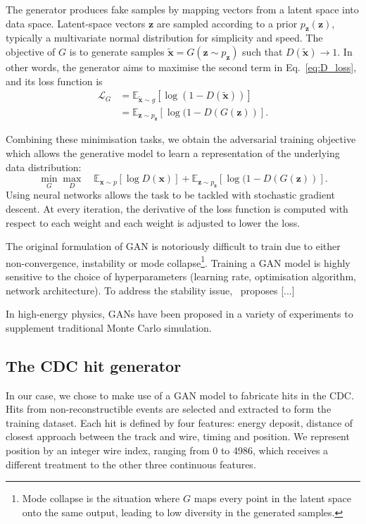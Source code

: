 The generator produces fake samples by mapping vectors from a latent space into data space. Latent-space vectors $\mathbf{z}$ are sampled according to a prior $p_\mathbf{z}(\mathbf{z})$, typically a multivariate normal distribution for simplicity and speed. The objective of $G$ is to generate samples $\tilde{\mathbf{x}} = G(\mathbf{z} \sim p_\mathbf{z})$ such that $D(\tilde{\mathbf{x}}) \rightarrow 1$. In other words, the generator aims to maximise the second term in Eq.~\ref{eq:D_loss}, and its loss function is
\begin{align*}
    \mathcal{L}_G &=     
    \mathbb{E}_{\tilde{\mathbf{x}} \sim g} [ \log( 1 - D(\tilde{\mathbf{x}}) )]\\
    &= \mathbb{E}_{\mathbf{z} \sim p_\mathbf{z}} [ \log( 1 - D(G(\mathbf{z}) )].
\end{align*}

Combining these minimisation tasks, we obtain the adversarial training objective which allows the generative model to learn a representation of the underlying data distribution:
\begin{equation*}
    \min_G \max_D \quad
    \mathbb{E}_{\mathbf{x} \sim p} [ \log D(\mathbf{x}) ] +
    \mathbb{E}_{\mathbf{z} \sim p_\mathbf{z}} [ \log( 1 - D(G(\mathbf{z}) )].
\end{equation*}
Using neural networks allows the task to be tackled with stochastic gradient descent. At every iteration, the derivative of the loss function is computed with respect to each weight and each weight is adjusted to lower the loss.

The original formulation of GAN is notoriously difficult to train due to either non-convergence, instability or mode collapse\footnote{Mode collapse is the situation where $G$ maps every point in the latent space onto the same output, leading to low diversity in the generated samples.}. Training a GAN model is highly sensitive to the choice of hyperparameters (learning rate, optimisation algorithm, network architecture). To address the stability issue,~\cite{arjovsky2017wasserstein} proposes [...]
\cite{NIPS2017_892c3b1c} %

In high-energy physics, GANs have been proposed in a variety of experiments to supplement traditional Monte Carlo simulation. 

\subsection{The CDC hit generator}
In our case, we chose to make use of a GAN model to fabricate hits in the CDC.
Hits from non-reconstructible events are selected and extracted to form the training dataset. Each hit is defined by four features: energy deposit, distance of closest approach between the track and wire, timing and position. We represent position by an integer wire index, ranging from 0 to 4986, which receives a different treatment to the other three continuous features.

